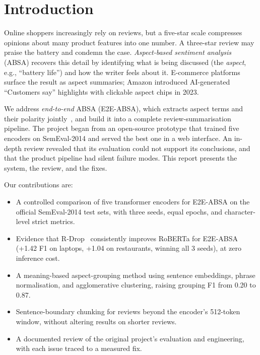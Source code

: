 \documentclass[conference]{IEEEtran}
\begin{document}
\section{Introduction}
Online shoppers increasingly rely on reviews, but a five-star scale compresses opinions about many product features into one number. A three-star review may praise the battery and condemn the case. \emph{Aspect-based sentiment analysis} (ABSA) recovers this detail by identifying what is being discussed (the \emph{aspect}, e.g., ``battery life'') and how the writer feels about it. E-commerce platforms surface the result as aspect summaries; Amazon introduced AI-generated ``Customers say'' highlights with clickable aspect chips in 2023.

We address \emph{end-to-end} ABSA (E2E-ABSA), which extracts aspect terms and their polarity jointly~\cite{li2019bert}, and build it into a complete review-summarisation pipeline. The project began from an open-source prototype that trained five encoders on SemEval-2014 and served the best one in a web interface. An in-depth review revealed that its evaluation could not support its conclusions, and that the product pipeline had silent failure modes. This report presents the system, the review, and the fixes.

Our contributions are:
\begin{itemize}
\item A controlled comparison of five transformer encoders for E2E-ABSA on the official SemEval-2014 test sets, with three seeds, equal epochs, and character-level strict metrics.
\item Evidence that R-Drop~\cite{liang2021rdrop} consistently improves RoBERTa for E2E-ABSA (+1.42 F1 on laptops, +1.04 on restaurants, winning all 3 seeds), at zero inference cost.
\item A meaning-based aspect-grouping method using sentence embeddings, phrase normalisation, and agglomerative clustering, raising grouping F1 from 0.20 to 0.87.
\item Sentence-boundary chunking for reviews beyond the encoder's 512-token window, without altering results on shorter reviews.
\item A documented review of the original project's evaluation and engineering, with each issue traced to a measured fix.
\end{itemize}

\end{document}
